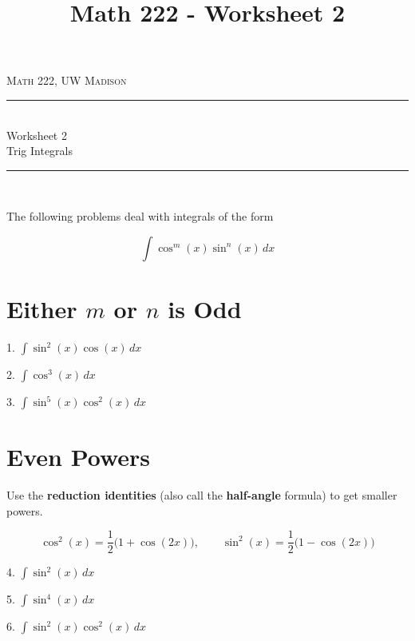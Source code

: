 \documentclass[paper=a4, fontsize=11pt]{scrartcl} %
\title{Math 222 - Worksheet 2}
\numberwithin{equation}{section} %
\numberwithin{figure}{section} %
\numberwithin{table}{section} %
\newcommand{\horrule}[1]{\rule{\linewidth}{#1}} %
\begin{document}
{
\normalfont \normalsize 
\begin{flushright}
\textsc{Math 222, UW Madison}
\end{flushright}
{\center
\horrule{0.5pt} \\[0.4cm] %
{\huge Worksheet 2}\\
Trig Integrals \\ %
\horrule{2pt} \\[0.5cm] %
}}



The following problems deal with integrals of the form

\[ \int \cos^m(x) \sin^n(x)\,dx \]

\section*{Either $m$ or $n$ is Odd}

1. \quad $\displaystyle \int \sin^2(x)\cos(x)\,dx$

\vfill

2. \quad $\displaystyle \int \cos^3(x)\,dx$

\vfill

3. \quad $\displaystyle \int \sin^5(x)\cos^2(x)\,dx$

\vfill

\newpage

\section*{Even Powers}

Use the {\bfseries reduction identities} (also call the {\bfseries half-angle} formula) to get smaller powers.

\[ \cos^2(x) = \frac{1}{2}\big(1 + \cos(2x)\big), \qquad \sin^2(x) = \frac{1}{2}\big(1 - \cos(2x)\big) \]

4. \quad $\displaystyle \int \sin^2(x)\,dx$

\vfill

5. \quad $\displaystyle \int \sin^4(x)\,dx$

\vfill

6. \quad $\displaystyle \int \sin^2(x)\cos^2(x)\,dx$

\vfill
\end{document}
